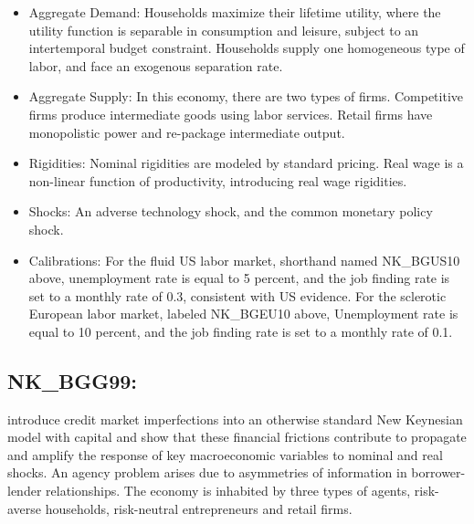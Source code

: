 \documentclass[11pt,a4paper]{article}
\begin{document}
	\begin{itemize}
		\item Aggregate Demand: Households maximize their lifetime utility, where
		the utility function is separable in consumption and leisure, subject to
		an intertemporal budget constraint. Households supply one homogeneous type of labor, and face an exogenous separation rate.
		\item Aggregate Supply: In this economy, there are two types of firms. Competitive firms produce intermediate goods using labor services. Retail firms have monopolistic power and re-package intermediate output.
		\item Rigidities: Nominal rigidities are modeled by standard \cite{Calvo1983}
		pricing. Real wage is a non-linear function of productivity, introducing
		real wage rigidities.
		\item Shocks: An adverse technology shock, and the common monetary policy shock.
		\item Calibrations: For the fluid US labor market, shorthand named NK\_BGUS10 above, unemployment rate is equal to 5 percent, and the job finding rate is set to a monthly rate of 0.3, consistent with
		US evidence. For the sclerotic European labor market, labeled NK\_BGEU10 above, Unemployment rate
		is equal to 10 percent, and the job finding rate is set to a monthly rate of 0.1. 
	\end{itemize}
	
	
	
	\subsection{NK\_BGG99: \texorpdfstring{\cite{BernankeGertlerGilchrist1999}}{Beranke et al. (1999)}}
	\label{NKBGG99}
	\cite{BernankeGertlerGilchrist1999} introduce credit market imperfections into an otherwise standard New Keynesian model with capital and show that these financial frictions contribute to propagate and amplify the response of key macroeconomic variables to nominal and real shocks. An agency problem arises due to asymmetries of information in borrower-lender relationships. The economy is inhabited by three types of agents, risk-averse households, risk-neutral entrepreneurs and retail firms.
	
\end{document}
